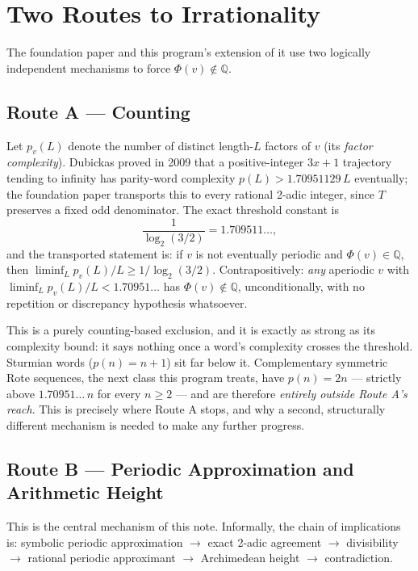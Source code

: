 \documentclass[11pt]{article}
\newcommand{\Q}{\mathbb{Q}}
\begin{document}
\section{Two Routes to Irrationality}
\label{sec:tworoutes}

The foundation paper and this program's extension of it use two logically independent mechanisms to force $\Phi(v)\notin\Q$.

\subsection{Route A --- Counting}
\label{sec:routeA}

Let $p_v(L)$ denote the number of distinct length-$L$ factors of $v$ (its \emph{factor complexity}). Dubickas proved in 2009 \cite{Dubickas2009} that a positive-integer $3x+1$ trajectory tending to infinity has parity-word complexity $p(L) > 1.70951129\,L$ eventually; the foundation paper transports this to every rational 2-adic integer, since $T$ preserves a fixed odd denominator. The exact threshold constant is
\[
\frac{1}{\log_2(3/2)} = 1.709511\ldots,
\]
and the transported statement is: if $v$ is not eventually periodic and $\Phi(v)\in\Q$, then $\liminf_L p_v(L)/L \ge 1/\log_2(3/2)$. Contrapositively: \emph{any} aperiodic $v$ with $\liminf_L p_v(L)/L < 1.70951\ldots$ has $\Phi(v)\notin\Q$, unconditionally, with no repetition or discrepancy hypothesis whatsoever.

This is a purely counting-based exclusion, and it is exactly as strong as its complexity bound: it says nothing once a word's complexity crosses the threshold. Sturmian words ($p(n)=n+1$) sit far below it. Complementary symmetric Rote sequences, the next class this program treats, have $p(n)=2n$ --- strictly above $1.70951\ldots\,n$ for every $n\ge 2$ --- and are therefore \emph{entirely outside Route A's reach}. This is precisely where Route A stops, and why a second, structurally different mechanism is needed to make any further progress.

\subsection{Route B --- Periodic Approximation and Arithmetic Height}
\label{sec:routeB}

This is the central mechanism of this note. Informally, the chain of implications is: symbolic periodic approximation $\to$ exact 2-adic agreement $\to$ divisibility $\to$ rational periodic approximant $\to$ Archimedean height $\to$ contradiction.
\end{document}
